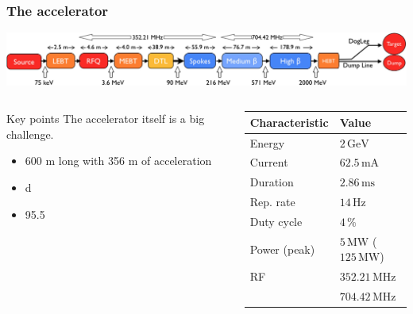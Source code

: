 \begin{frame}
  \frametitle{The accelerator}
  \includegraphics[width=\textwidth]{01_Neutron/fig/fig000_ESS_acc}
  \vfill
  \begin{columns}
    \begin{column}{0.45\textwidth}
      \begin{block}{Key points}
        The accelerator itself is a big challenge.
        \begin{itemize}
          \item 600 m long with 356 m of acceleration
          \item d
          \item 95.5
        \end{itemize}
      \end{block}
    \end{column}
    \begin{column}{0.50\textwidth}
      \begin{tabularx}{\linewidth}{XX}
        \toprule
        Characteristic & Value                                 \\
        \midrule
        Energy         & $2\,\mathrm{GeV}$                     \\
        Current        & $62.5\,\mathrm{mA}$                   \\
        Duration       & $2.86\,\mathrm{ms}$                   \\
        Rep. rate      & $14\,\mathrm{Hz}$                     \\
        Duty cycle     & $4\,\mathrm{\%}$                      \\
        Power (peak)   & $5\,\mathrm{MW}$ ($125\,\mathrm{MW}$) \\
        RF             & $352.21\,\mathrm{MHz}$                \\
                       & $704.42\,\mathrm{MHz}$                \\
        \bottomrule
      \end{tabularx}
    \end{column}
  \end{columns}
\end{frame}